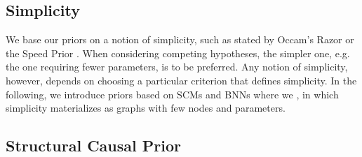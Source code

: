 \documentclass{article}
\begin{document}


\subsection{Simplicity}
\label{sec:modelling simplicity assumptions}
We base our priors on a notion of simplicity, such as stated by Occam's Razor or the Speed Prior \citep{speedprior}.
When considering competing hypotheses, the simpler one, e.g. the one requiring fewer parameters, is to be preferred.
Any notion of simplicity, however, depends on choosing a particular criterion that defines simplicity.
In the following, we introduce priors based on SCMs and BNNs where we , in which simplicity materializes as graphs with few nodes and parameters. %

\subsection{Structural Causal Prior}
\end{document}
